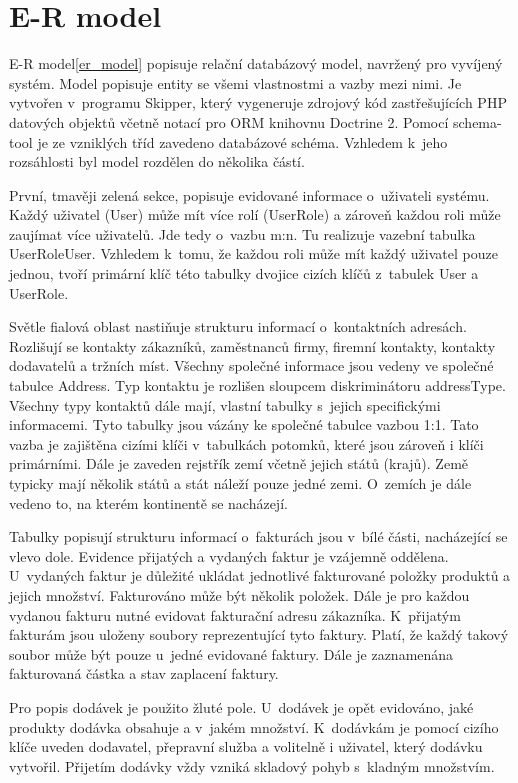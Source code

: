 \documentclass[thesis=B,czech]{FITthesis}[2012/06/26]
\begin{document}
\section{E-R model}
	E-R model\ref{er_model} popisuje relační databázový model, navržený pro vyvíjený systém. Model popisuje entity se všemi vlastnostmi a vazby mezi nimi. Je vytvořen v~programu Skipper, který vygeneruje zdrojový kód zastřešujících PHP datových objektů včetně notací pro ORM knihovnu Doctrine 2. Pomocí schema-tool je ze vzniklých tříd zavedeno databázové schéma. Vzhledem k~jeho rozsáhlosti byl model rozdělen do několika částí.
	
	První, tmavěji zelená sekce, popisuje evidované informace o~uživateli systému. Každý uživatel (User) může mít více rolí (UserRole) a zároveň každou roli může zaujímat více uživatelů. Jde tedy o~vazbu m:n. Tu realizuje vazební tabulka UserRoleUser. Vzhledem k~tomu, že každou roli může mít každý uživatel pouze jednou, tvoří primární klíč této tabulky dvojice cizích klíčů z~tabulek User a UserRole.
	
	Světle fialová oblast nastiňuje strukturu informací o~kontaktních adresách. Rozlišují se kontakty zákazníků, zaměstnanců firmy, firemní kontakty, kontakty dodavatelů a tržních míst. Všechny společné informace jsou vedeny ve společné tabulce Address. Typ kontaktu je rozlišen sloupcem diskriminátoru addressType. Všechny typy kontaktů dále mají, vlastní tabulky s~jejich specifickými informacemi. Tyto tabulky jsou vázány ke společné tabulce vazbou 1:1. Tato vazba je zajištěna cizími klíči v~tabulkách potomků, které jsou zároveň i klíči primárními. Dále je zaveden rejstřík zemí včetně jejich států (krajů). Země typicky mají několik států a stát náleží pouze jedné zemi. O~zemích je dále vedeno to, na kterém kontinentě se nacházejí.
	
	Tabulky popisují strukturu informací o~fakturách jsou v~bílé části, nacházející se vlevo dole. Evidence přijatých a vydaných faktur je vzájemně oddělena. U~vydaných faktur je důležité ukládat jednotlivé fakturované položky produktů a jejich množství. Fakturováno může být několik položek. Dále je pro každou vydanou fakturu nutné evidovat fakturační adresu zákazníka. K~přijatým fakturám jsou uloženy soubory reprezentující tyto faktury. Platí, že každý takový soubor může být pouze u~jedné evidované faktury. Dále je zaznamenána fakturovaná částka a stav zaplacení faktury. 
	
	Pro popis dodávek je použito žluté pole. U~dodávek je opět evidováno, jaké produkty dodávka obsahuje a v~jakém množství. K~dodávkám je pomocí cizího klíče uveden dodavatel, přepravní služba a volitelně i uživatel, který dodávku vytvořil. Přijetím dodávky vždy vzniká skladový pohyb s~kladným množstvím.
	
\end{document}
